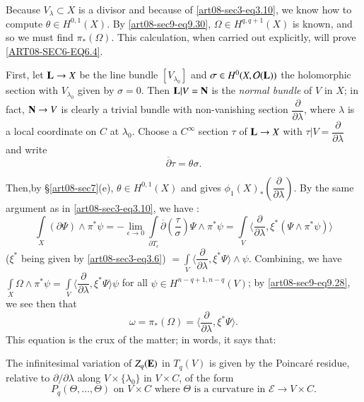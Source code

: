 Because $V_{\lambda}\subset X$ is a divisor and because of \eqref{art08-sec3-eq3.10}, we know how to compute $\theta\in H^{0,1}(X)$. By \eqref{art08-sec9-eq9.30}, $\Omega\in H^{q,q+1}(X)$ is known, and so we must find $\pi_{*}(\Omega)$. This calculation, when carried out explicitly, will prove \eqref{ART08-SEC6-EQ6.4}.

First, let $\mathbf{L}\to X$ be the line bundle $[V_{\lambda_{0}}]$ and $\sigma\in H^{0}(X,\mathcal{O}(\mathbf{L}))$ the holomorphic section with $V_{\lambda_{0}}$ given by $\sigma=0$. Then $\mathbf{L}|V=\mathbf{N}$ is the {\em normal bundle} of $V$ in $X$; in fact, $\mathbf{N}\to V$ is clearly a trivial bundle with non-vanishing section $\dfrac{\partial}{\partial\lambda}$, where $\lambda$ is a local coordinate on $C$ at $\lambda_{0}$. Choose a $C^{\infty}$ section $\tau$ of $\mathbf{L}\to X$ with $\tau|V=\dfrac{\partial}{\partial\lambda}$ and write
\begin{equation*}
\overline{\partial}\tau = \theta\sigma.\tag{9.31}\label{art08-sec9-eq9.31}
\end{equation*}

Then,\pageoriginale by \S\ref{art08-sec7}(e), $\theta\in H^{0,1}(X)$ and gives $\phi_{1}(X)_{*}\left(\dfrac{\partial}{\partial\lambda}\right)$. By the same argument as in \eqref{art08-sec3-eq3.10}, we have :
$$
\int\limits_{X}(\partial \Psi)\wedge \pi^{*}\psi=-\lim\limits_{\epsilon\to 0}\int\limits_{\partial T_{\epsilon}}\overline{\partial}\left(\dfrac{\tau}{\sigma}\right)\Psi \wedge \pi^{*}\psi=\int\limits_{V}\langle \dfrac{\partial}{\partial \lambda},\xi^{*}(\Psi\wedge\pi^{*}\psi)\rangle
$$
($\xi^{*}$ being given by \eqref{art08-sec3-eq3.6}) $=\int\limits_{V}\langle \dfrac{\partial}{\partial \lambda}, \xi^{*}\Psi\rangle \wedge\psi$. Combining, we have $\int\limits_{X}\Omega \wedge \pi^{*}\psi=\int\limits_{V}\langle \dfrac{\partial}{\partial\lambda},\xi^{*}\Psi\rangle \psi$ for all $\psi\in H^{n-q+1,n-q}(V)$; by \eqref{art08-sec9-eq9.28}, we see then that
\begin{equation*}
\omega=\pi_{*}(\Omega)=\langle \dfrac{\partial}{\partial\lambda},\xi^{*}\Psi\rangle.\tag{9.32}\label{art08-sec9-eq9.32}
\end{equation*}
This equation is the crux of the matter; in words, it says that:

The infinitesimal variation of $Z_{q}(\mathbf{E})$ in $T_{q}(V)$ is given by the Poincar\'e residue, relative to $\partial/\partial\lambda$ along $V\times \{\lambda_{0}\}$ in $V\times C$, of the form 
\begin{equation*}
P_{q}(\Theta,\ldots,\Theta)\text{ on } V\times C\text{ where } \Theta \text{ is a curvature in } \mathcal{E}\to V\times C.\tag{9.33}\label{art08-sec9-eq9.33}
\end{equation*}

